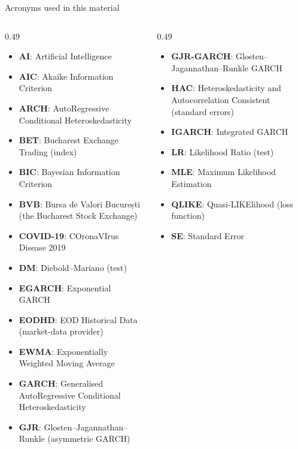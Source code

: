 \begin{frame}{Acronyms used in this material}
\begin{columns}[T]
\begin{column}{0.49\textwidth}
\begin{itemize}\setlength{\itemsep}{0pt}
    \item \textbf{AI}: Artificial Intelligence
    \item \textbf{AIC}: Akaike Information Criterion
    \item \textbf{ARCH}: AutoRegressive Conditional Heteroskedasticity
    \item \textbf{BET}: Bucharest Exchange Trading (index)
    \item \textbf{BIC}: Bayesian Information Criterion
    \item \textbf{BVB}: Bursa de Valori București (the Bucharest Stock Exchange)
    \item \textbf{COVID-19}: COronaVIrus Disease 2019
    \item \textbf{DM}: Diebold–Mariano (test)
    \item \textbf{EGARCH}: Exponential GARCH
    \item \textbf{EODHD}: EOD Historical Data (market-data provider)
    \item \textbf{EWMA}: Exponentially Weighted Moving Average
    \item \textbf{GARCH}: Generalised AutoRegressive Conditional Heteroskedasticity
    \item \textbf{GJR}: Glosten–Jagannathan–Runkle (asymmetric GARCH)
\end{itemize}
\end{column}
\begin{column}{0.49\textwidth}
\begin{itemize}\setlength{\itemsep}{0pt}
    \item \textbf{GJR-GARCH}: Glosten–Jagannathan–Runkle GARCH
    \item \textbf{HAC}: Heteroskedasticity and Autocorrelation Consistent (standard errors)
    \item \textbf{IGARCH}: Integrated GARCH
    \item \textbf{LR}: Likelihood Ratio (test)
    \item \textbf{MLE}: Maximum Likelihood Estimation
    \item \textbf{QLIKE}: Quasi-LIKElihood (loss function)
    \item \textbf{SE}: Standard Error
\end{itemize}
\end{column}
\end{columns}
\end{frame}


